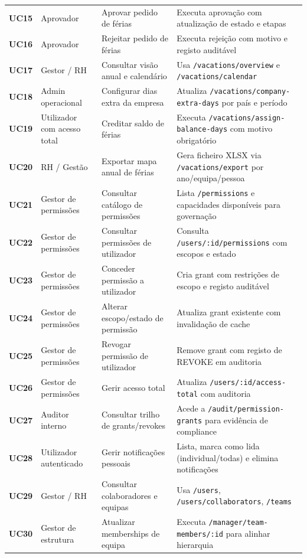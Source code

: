 \documentclass[11pt,a4paper,twoside]{article}
\begin{document}
\begin{longtable}{>{\small\centering\arraybackslash\bfseries}p{0.85cm} >{\small}p{2.6cm} >{\small}p{3.5cm} >{\small}p{6.3cm}}
UC15 & Aprovador & Aprovar pedido de férias & Executa aprovação com atualização de estado e etapas \\
UC16 & Aprovador & Rejeitar pedido de férias & Executa rejeição com motivo e registo auditável \\
UC17 & Gestor / RH & Consultar visão anual e calendário & Usa \texttt{/vacations/overview} e \texttt{/vacations/calendar} \\
UC18 & Admin operacional & Configurar dias extra da empresa & Atualiza \texttt{/vacations/company-extra-days} por país e período \\
UC19 & Utilizador com acesso total & Creditar saldo de férias & Executa \texttt{/vacations/assign-balance-days} com motivo obrigatório \\
UC20 & RH / Gestão & Exportar mapa anual de férias & Gera ficheiro XLSX via \texttt{/vacations/export} por ano/equipa/pessoa \\
UC21 & Gestor de permissões & Consultar catálogo de permissões & Lista \texttt{/permissions} e capacidades disponíveis para governação \\
UC22 & Gestor de permissões & Consultar permissões de utilizador & Consulta \texttt{/users/:id/permissions} com escopos e estado \\
UC23 & Gestor de permissões & Conceder permissão a utilizador & Cria grant com restrições de escopo e registo auditável \\
UC24 & Gestor de permissões & Alterar escopo/estado de permissão & Atualiza grant existente com invalidação de cache \\
UC25 & Gestor de permissões & Revogar permissão de utilizador & Remove grant com registo de REVOKE em auditoria \\
UC26 & Gestor de permissões & Gerir acesso total & Atualiza \texttt{/users/:id/access-total} com auditoria \\
UC27 & Auditor interno & Consultar trilho de grants/revokes & Acede a \texttt{/audit/permission-grants} para evidência de compliance \\
UC28 & Utilizador autenticado & Gerir notificações pessoais & Lista, marca como lida (individual/todas) e elimina notificações \\
UC29 & Gestor / RH & Consultar colaboradores e equipas & Usa \texttt{/users}, \texttt{/users/collaborators}, \texttt{/teams} \\
UC30 & Gestor de estrutura & Atualizar memberships de equipa & Executa \texttt{/manager/team-members/:id} para alinhar hierarquia \\

\end{longtable}
\end{document}
